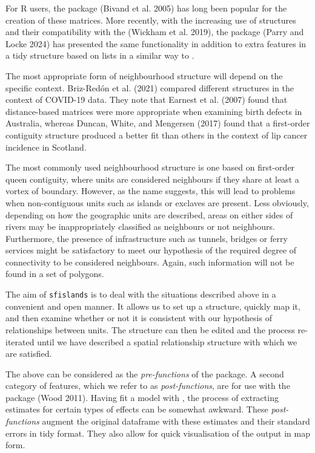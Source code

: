 For R users, the  package (Bivand et al. 2005) has long been popular for the
creation of these matrices. More recently, with the increasing use of 
structures and their compatibility with the  (Wickham et al. 2019), the  package (Parry and Locke 2024) has presented the same
functionality in addition to extra features in a tidy structure based on
lists in a similar way to .

The most appropriate form of neighbourhood structure will depend on the specific context. Briz-Redón et al. (2021) compared different structures in the context of COVID-19 data. They note that Earnest et al. (2007) found that distance-based matrices were more appropriate when examining birth defects in Australia, whereas Duncan, White, and Mengersen (2017) found that a first-order contiguity structure produced a better fit than others in the context of lip cancer incidence in Scotland.

The most commonly used neighbourhood structure is one based on first-order queen contiguity, where units are considered neighbours if they
share at least a vortex of boundary. However, as the name suggests, this
will lead to problems when non-contiguous units such as islands or
exclaves are present. Less obviously, depending on how the geographic
units are described, areas on either sides of rivers may be
inappropriately classified as neighbours or not neighbours. Furthermore,
the presence of infrastructure such as tunnels, bridges or ferry
services might be satisfactory to meet our hypothesis of the required
degree of connectivity to be considered neighbours. Again, such information will not be found in a set of polygons.

The aim of \texttt{sfislands} is to deal with the situations described above in a
convenient and open manner. It allows us to set up a structure, quickly
map it, and then examine whether or not it is consistent with our hypothesis of relationships between units. The structure can then be edited and the process re-iterated until we have described a
spatial relationship structure with which we are satisfied.

The above can be considered as the \emph{pre-functions} of the package. A
second category of features, which we refer to as \emph{post-functions},
are for use with the  package (Wood 2011). Having fit a model with , the process of extracting estimates for certain types of effects can be somewhat awkward. These \emph{post-functions} augment the original dataframe with these estimates and their standard errors in tidy format. They also allow for quick visualisation of the output in map form.

